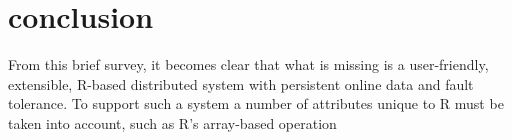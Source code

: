 \documentclass[a4paper,10pt]{article}
\begin{document}
\section{conclusion}

From this brief survey, it becomes clear that what is missing is a user-friendly, extensible, R-based distributed system with persistent online data and fault tolerance.
To support such a system a number of attributes unique to R must be taken into account, such as R's array-based operation 

\printbibliography
\end{document}

